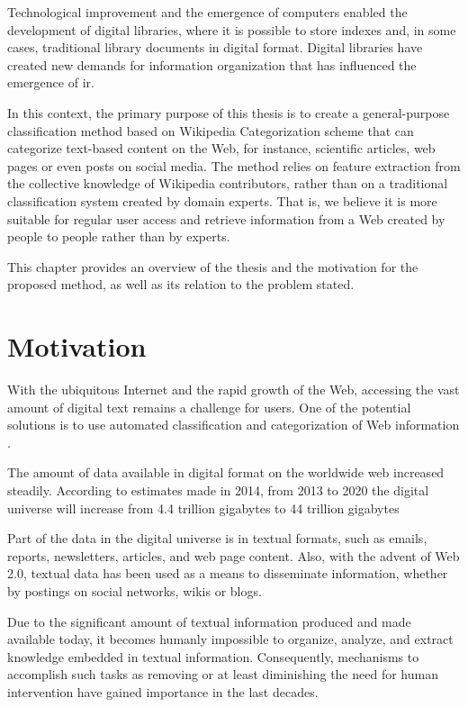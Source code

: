Technological improvement and the emergence of computers enabled the development of digital libraries, where it is possible to store indexes and, in some cases, traditional library documents in digital format. Digital libraries have created new demands for information organization that has influenced the emergence of \gls{ir}.

In this context, the primary purpose of this thesis is to create a general-purpose classification method based on Wikipedia Categorization scheme that can categorize text-based content on the Web, for instance, scientific articles, web pages or even posts on social media. The method relies on feature extraction from the collective knowledge of Wikipedia contributors, rather than on a traditional classification system created by domain experts. That is, we believe it is more suitable for regular user access and retrieve information from a Web created by people to people rather than by experts.

This chapter provides an overview of the thesis and the motivation for the proposed method, as well as its relation to the problem stated. 

\section{\hspace*{3pt}Motivation}

With the ubiquitous Internet and the rapid growth of the Web, accessing the vast amount of digital text remains a challenge for users. One of the potential solutions is to use automated classification and categorization of Web information \cite{Gabrilovich:2005}.

The amount of data available in digital format on the worldwide web increased steadily. According to estimates made in 2014, from 2013 to 2020 the digital universe will increase from 4.4 trillion gigabytes to 44 trillion gigabytes ~\cite{turner2014digital}

Part of the data in the digital universe is in textual formats, such as emails, reports, newsletters, articles, and web page content. Also, with the advent of Web 2.0, textual data has been used as a means to disseminate information, whether by postings on social networks, wikis or blogs. ~\cite{fuchs2013internet} ~\cite{o2009web}

Due to the significant amount of textual information produced and made available today, it becomes humanly impossible to organize, analyze, and extract knowledge embedded in textual information. Consequently, mechanisms to accomplish such tasks as removing or at least diminishing the need for human intervention have gained importance in the last decades. ~\cite{feldman2007text} ~\cite{berry2010text} ~\cite{aggarwal2012mining} 

